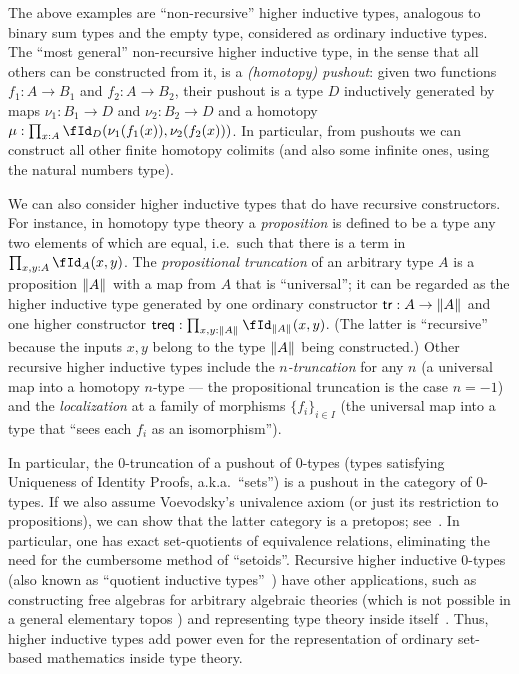 The above examples are ``non-recursive'' higher inductive types, analogous to binary sum types and the empty type, considered as ordinary inductive types.
The ``most general'' non-recursive higher inductive type, in the sense that all others can be constructed from it, is a \emph{(homotopy) pushout}: given two functions $f_1:A\to B_1$ and $f_2:A\to B_2$, their pushout is a type $D$ inductively generated by maps $\nu_1:B_1\to D$ and $\nu_2:B_2\to D$ and a homotopy $\mu:\prod_{x:A} \id[D]{\nu_1(f_1(x))}{\nu_2(f_2(x))}$.
In particular, from pushouts we can construct all other finite homotopy colimits (and also some infinite ones, using the natural numbers type).

We can also consider higher inductive types that do have recursive constructors.
For instance, in homotopy type theory a \emph{proposition} is defined to be a type any two elements of which are equal, i.e.\ such that there is a term in $\prod_{x,y:A} \id[A]xy$.
The \emph{propositional truncation} of an arbitrary type $A$ is a proposition $\mathopen{}\left\Vert A\right\Vert_{}\mathclose{}$ with a map from $A$ that is ``universal''; it can be regarded as the higher inductive type generated by one ordinary constructor $\mathsf{tr}:A\to\mathopen{}\left\Vert A\right\Vert_{}\mathclose{}$ and one higher constructor $\treq : \prod_{x,y:\brck{A}}\id[\brck{A}]{x}{y}$.
(The latter is ``recursive'' because the inputs $x,y$ belong to the type $\mathopen{}\left\Vert A\right\Vert_{}\mathclose{}$ being constructed.)
Other recursive higher inductive types include the \emph{$n$-truncation} for any $n$ (a universal map into a homotopy $n$-type --- the propositional truncation is the case $n=-1$) and the \emph{localization} at a family of morphisms $\{f_i\}_{i\in I}$ (the universal map into a type that ``sees each $f_i$ as an isomorphism'').

In particular, the $0$-truncation of a pushout of $0$-types (types satisfying Uniqueness of Identity Proofs, a.k.a.\ ``sets'') is a pushout in the category of $0$-types.
If we also assume Voevodsky's univalence axiom (or just its restriction to propositions), we can show that the latter category is a pretopos; see~\cite[Chapter 10]{hottbook}.
In particular, one has exact set-quotients of equivalence relations, eliminating the need for the cumbersome method of ``setoids''.
Recursive higher inductive $0$-types (also known as ``quotient inductive types''~\cite{acdf:qiits}) have other applications, such as constructing free algebras for arbitrary algebraic theories (which is not possible in a general elementary topos \cite{blass:freealg}) and representing type theory inside itself~\cite{ak:tt-qit}.
Thus, higher inductive types add power even for the representation of ordinary set-based mathematics inside type theory.

